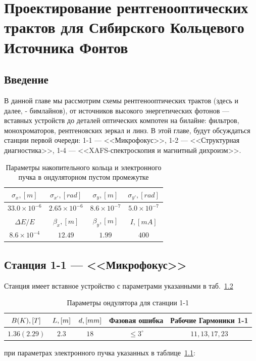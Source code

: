 \chapter{Проектирование рентгенооптических трактов для Сибирского Кольцевого Источника Фонтов}

\section{Введение}
В данной главе мы рассмотрим схемы рентгенооптических трактов (здесь и далее, - бимлайнов), от источников высокого энергетических фотонов --- вставных устройств до деталей оптических компотен на билайне: фильтров, монохроматоров, рентгеновских зеркал и линз. В этой главе, будут обсуждаться станции первой очереди: 1-1 --- <<Микрофокус>>, 1-2 --- <<Структурная диагностика>>, 1-4 --- <<XAFS-спектроскопия и магнитный дихроизм>>.  
\begin{table}[h!]
	\centering
	\begin{tabular}{c|c|c|c}
		\hline\hline
		\rule{0pt}{3ex}   $\sigma_x, [m]$ & $\sigma_{x'}, [rad]$ & $\sigma_y, [m]$     & $\sigma_{y'}, [rad]$ \\ \hline
		\rule{0pt}{3ex}   $33.0 \times 10^{-6}$  & $2.65 \times 10^{-6}$  &  $8.6 \times 10^{-7}$ & $5.0 \times 10^{-7}$   \\
		\hline	\hline
		\rule{0pt}{3ex}   $\Delta E / E$ & $\beta_x,[m]$ & $\beta_y,[m]$   & $I,[mA]$\\ \hline
		\rule{0pt}{3ex}	 $8.6 \times 10^{-4}$ & $12.49$ & $1.99$ & $400$ \\ \hline\hline
	\end{tabular}
	\vspace{4pt} 
	\caption{Параметры накопительного кольца и электронного пучка в ондуляторном пустом промежутке}
	\label{table:ebeam}
\end{table}
\section{Станция 1-1 --- <<Микрофокус>>}
Станция имеет вставное устройство с параметрами указанными в таб.~\ref{table:und1-1}
\begin{table}[h!]
	\centering
	\begin{tabular}{c|c|c|c|c}
		\hline\hline
		\rule{0pt}{3ex}$\mathnormal{B(K), [T]}$   & $\mathnormal{L, [m]}$ & $\mathnormal{d, [mm]}$ & Фазовая ошибка                & Рабочие Гармоники 1-1       \\ \hline
		\rule{0pt}{3ex}$1.36(2.29)$  & $2.3$    & $18$      & $\leq 3^{\circ}$& $11, 13, 17, 23$\\
		\hline\hline
	\end{tabular}
	\vspace{4pt} 
	\caption{Параметры ондулятора для станции 1-1}
	\label{table:und1-1}
\end{table}
при параметрах электронного пучка указанных в таблице~\ref{table:ebeam}: 

